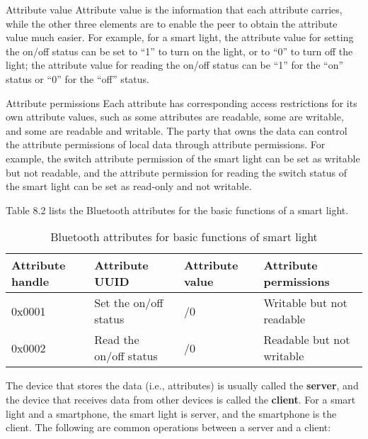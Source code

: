 \documentclass[a4paper,12pt]{book}
\begin{document}
\begin{term}{Attribute value}
    Attribute value is the information that each attribute carries, while the other three elements are to enable the peer to obtain the attribute value much easier. For example, for a smart light, the attribute value for setting the on/off status can be set to “1” to turn on the light, or to “0” to turn off the light; the attribute value for reading the on/off status can be “1” for the “on” status or “0” for the “off” status.
\end{term}

\begin{term}{Attribute permissions}
    Each attribute has corresponding access restrictions for its own attribute values, such as some attributes are readable, some are writable, and some are readable and writable. The party that owns the data can control the attribute permissions of local data through attribute permissions. For example, the switch attribute permission of the smart light can be set as writable but not readable, and the attribute permission for reading the switch status of the smart light can be set as read-only and not writable.
\end{term}

Table 8.2 lists the Bluetooth attributes for the basic functions of a smart light.

\begin{table}[h!]
    \renewcommand{\arraystretch}{1.4}
    \caption{Bluetooth attributes for basic functions of smart light}
    \begin{tabular}{|>{\Centering}m{6em}|>{\Centering}m{10em}|>{\Centering}m{6em}|>{\Centering}m{16em}|}
        \hline
        \rowcolor{LightBlue} \textbf{Attribute handle}&\textbf{Attribute UUID}&\textbf{Attribute value}&\textbf{Attribute permissions}\\
        \hline
        0x0001&Set the on/off status&1/0&Writable but not readable\\
        \hline
        0x0002&Read the on/off status&1/0&Readable but not writable\\
        \hline
    \end{tabular}
\end{table}

The device that stores the data (i.e., attributes) is usually called the \textbf{server}, and the device that receives data from other devices is called the \textbf{client}. For a smart light and a smartphone, the smart light is server, and the smartphone is the client. The following are common operations between a server and a client:
\end{document}
